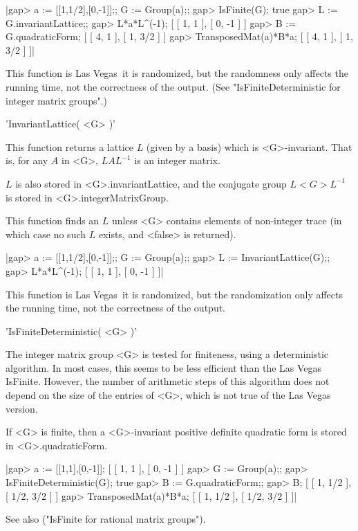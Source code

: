 |gap> a := [[1,1/2],[0,-1]];; G := Group(a);;
gap> IsFinite(G);
true
gap> L := G.invariantLattice;;
gap> L*a*L^(-1);
[ [ 1, 1 ], [ 0, -1 ] ]
gap> B := G.quadraticForm;
[ [ 4, 1 ], [ 1, 3/2 ] ]
gap> TransposedMat(a)*B*a;
[ [ 4, 1 ], [ 1, 3/2 ] ]|


This function is Las Vegas\:\ it is randomized, but the randomness only
affects the running time, not the correctness of the output.
(See "IsFiniteDeterministic for integer matrix groups".)


'InvariantLattice( <G> )'

This function returns a lattice $L$ (given by a basis)
which is <G>-invariant.  That is, for any $A$ in <G>,
$L A L^{-1}$ is an integer matrix.

$L$ is also stored in <G>.invariantLattice, and the conjugate
group $L <G> L^{-1}$ is stored in <G>.integerMatrixGroup.

This function finds an $L$ unless <G> contains elements of 
non-integer trace (in which case no such $L$ exists, and
<false> is returned).

|gap> a := [[1,1/2],[0,-1]];; G := Group(a);;
gap> L := InvariantLattice(G);;
gap> L*a*L^(-1);
[ [ 1, 1 ], [ 0, -1 ] ]|

This function is Las Vegas\:\  it is randomized, but the
randomization only affects the running time, not the correctness
of the output.

'IsFiniteDeterministic( <G> )'

The integer matrix group <G> is tested for finiteness,
using a deterministic algorithm.  In most cases, this
seems to be less efficient than the Las Vegas IsFinite.
However, the number of arithmetic steps of this algorithm
does not depend on the size of the entries of <G>, which
is not true of the Las Vegas version.

If <G> is finite, then a <G>-invariant positive definite 
quadratic form is stored in <G>.quadraticForm.

|gap> a := [[1,1],[0,-1]];
[ [ 1, 1 ], [ 0, -1 ] ]
gap> G := Group(a);;
gap> IsFiniteDeterministic(G);
true
gap> B := G.quadraticForm;;
gap> B;
[ [ 1, 1/2 ], [ 1/2, 3/2 ] ]
gap> TransposedMat(a)*B*a;
[ [ 1, 1/2 ], [ 1/2, 3/2 ] ]|


See also ("IsFinite for rational matrix groups"). 



